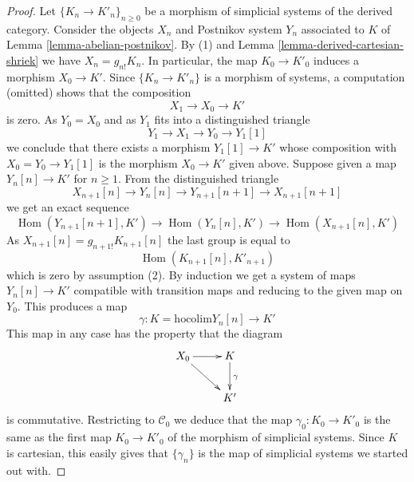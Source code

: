 \documentclass{stacks-project}
\theoremstyle{plain}
\theoremstyle{definition}
\theoremstyle{remark}
\numberwithin{equation}{subsection}
\def\Hom{\mathop{\mathrm{Hom}}\nolimits}
\begin{document}
\begin{proof}
Let $\{K_n \to K'_n\}_{n \geq 0}$
be a morphism of simplicial systems of the derived category.
Consider the objects $X_n$ and Postnikov system $Y_n$
associated to $K$ of Lemma \ref{lemma-abelian-postnikov}.
By (1) and Lemma \ref{lemma-derived-cartesian-shriek} we have
$X_n = g_{n!}K_n$. In particular, the map $K_0 \to K'_0$
induces a morphism $X_0 \to K'$. Since $\{K_n \to K'_n\}$
is a morphism of systems, a computation (omitted) shows that
the composition
$$
X_1 \to X_0 \to K'
$$
is zero. As $Y_0 = X_0$ and as $Y_1$ fits into a distinguished
triangle
$$
Y_1 \to X_1 \to Y_0 \to Y_1[1]
$$
we conclude that there exists a morphism $Y_1[1] \to K'$ whose
composition with $X_0 = Y_0 \to Y_1[1]$ is the morphism $X_0 \to K'$
given above. Suppose given a map $Y_n[n] \to K'$ for $n \geq 1$.
From the distinguished triangle
$$
X_{n + 1}[n] \to Y_n[n] \to Y_{n + 1}[n + 1] \to X_{n + 1}[n + 1]
$$
we get an exact sequence
$$
\Hom(Y_{n + 1}[n + 1], K') \to
\Hom(Y_n[n], K') \to
\Hom(X_{n + 1}[n], K')
$$
As $X_{n + 1}[n] = g_{n + 1!}K_{n + 1}[n]$ the last group is equal to
$$
\Hom(K_{n + 1}[n], K'_{n + 1})
$$
which is zero by assumption (2). By induction we get a system of
maps $Y_n[n] \to K'$ compatible with transition maps and reducing
to the given map on $Y_0$. This produces a map
$$
\gamma :
K = \text{hocolim} Y_n[n]
\longrightarrow
K'
$$
This map in any case has the property that the diagram
$$
\xymatrix{
X_0 \ar[rd] \ar[r] &
K \ar[d]^\gamma \\
& K'
}
$$
is commutative. Restricting to
$\mathcal{C}_0$ we deduce that the map $\gamma_0 : K_0 \to K'_0$
is the same as the first map $K_0 \to K'_0$ of the morphism
of simplicial systems. Since $K$ is cartesian, this easily gives that
$\{\gamma_n\}$ is the map of simplicial systems we started out with.
\end{proof}
\end{document}
